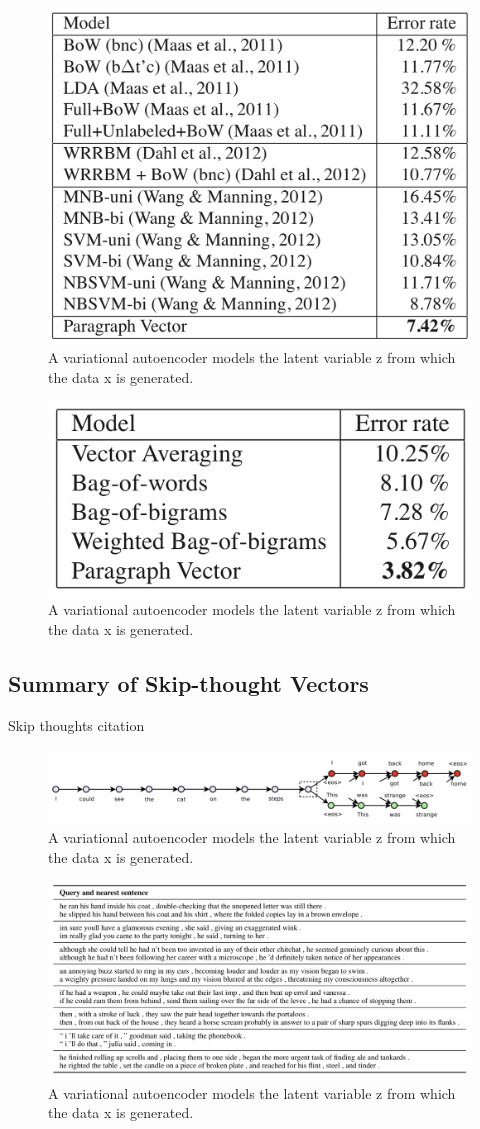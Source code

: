 \begin{figure}
\centering
  \includegraphics[width=.5\linewidth]{files/doc2vec-5.png}
  \caption{A variational autoencoder models the latent variable z from which the data x is generated.}
  \label{fig:vae}
\end{figure}

\begin{figure}
\centering
  \includegraphics[width=.5\linewidth]{files/doc2vec-6.png}
  \caption{A variational autoencoder models the latent variable z from which the data x is generated.}
  \label{fig:vae}
\end{figure}


\subsection{Summary of Skip-thought Vectors}

Skip thoughts citation \cite{DBLP:journals/corr/KirosZSZTUF15}

\begin{figure}
\centering
  \includegraphics[width=.5\linewidth]{files/skipthoughts-1.png}
  \caption{A variational autoencoder models the latent variable z from which the data x is generated.}
  \label{fig:vae}
\end{figure}

\begin{figure}
\centering
  \includegraphics[width=.5\linewidth]{files/skipthoughts-2.png}
  \caption{A variational autoencoder models the latent variable z from which the data x is generated.}
  \label{fig:vae}
\end{figure}

